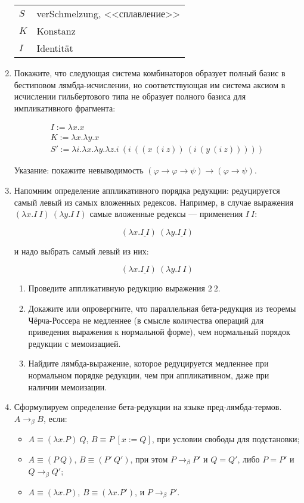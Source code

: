 \documentclass[10pt,a4paper,oneside]{article}
\begin{document}
\begin{enumerate}
\begin{tabular}{ll}
$S$ & verSchmelzung, <<сплавление>> \\
$K$ & Konstanz \\
$I$ & Identit\"at
\end{tabular}

\item Покажите, что следующая система комбинаторов образует полный базис в бестиповом
лямбда-исчислении, но соответствующая им система аксиом в исчислении гильбертового типа
не образует полного базиса для импликативного фрагмента:

$$\begin{array}{l}
I := \lambda x.x\\
K := \lambda x.\lambda y.x\\
S' := \lambda i.\lambda x.\lambda y.\lambda z.i\ (i\ ((x\ (i\ z))\ (i\ (y\ (i\ z)))))
\end{array}$$

Указание: покажите невыводимость $(\varphi \rightarrow \varphi \rightarrow \psi) \rightarrow (\varphi \rightarrow \psi)$.

\item Напомним определение аппликативного порядка редукции:
редуцируется самый левый из самых вложенных редексов. Например, в случае выражения
$(\lambda x.I\ I)\ (\lambda y.I\ I)$ самые вложенные редексы --- применения $I\ I$:

$$(\lambda x.\underline{I\ I})\ (\lambda y.\underline{I\ I})$$

и надо выбрать самый левый из них:

$$(\lambda x.\underline{I\ I})\ (\lambda y.I\ I)$$
\begin{enumerate}
\item Проведите аппликативную редукцию выражения $2\ 2$.
\item Докажите или опровергните, что параллельная бета-редукция из теоремы Чёрча-Россера не медленнее 
(в смысле количества операций для приведения выражения к нормальной форме), чем нормальный порядок 
редукции с мемоизацией.
\item Найдите лямбда-выражение, которое редуцируется медленнее при нормальном порядке редукции,
чем при аппликативном, даже при наличии мемоизации.
\end{enumerate}

\item Сформулируем определение бета-редукции на языке пред-лямбда-термов. $A \rightarrow_\beta B$, если:
\begin{itemize}
\item $A \equiv (\lambda x.P)\ Q$, $B \equiv P\ [x := Q]$, при условии свободы для подстановки;
\item $A \equiv (P\ Q)$, $B \equiv (P'\ Q')$, при этом $P \rightarrow_\beta P'$ и $Q = Q'$, либо $P = P'$ и $Q \rightarrow_\beta Q'$;
\item $A \equiv (\lambda x.P)$, $B \equiv (\lambda x.P')$, и $P \rightarrow_\beta P'$.
\end{itemize}


\end{enumerate}
\end{document}
